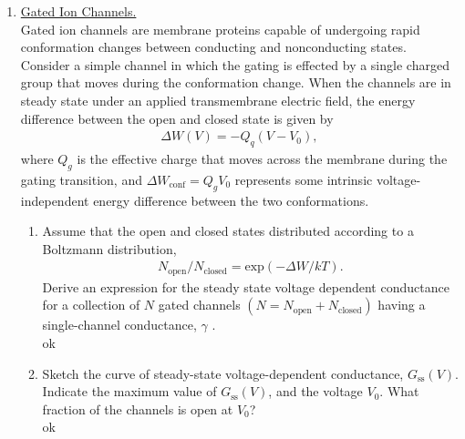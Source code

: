 \documentclass[11pt]{article}
\begin{document}
\begin{enumerate}[label=\arabic*.]
\newpage
\item
\underline{Gated Ion Channels.}
\vspace*{1\baselineskip}
\\
Gated ion channels are membrane proteins capable of undergoing rapid conformation changes between conducting and nonconducting states. Consider a simple channel in which the gating is effected by a single charged group that moves during the conformation change. When the channels are in steady state under an applied transmembrane electric field, the energy difference between the open and closed state is given by
\begin{align*}
\Delta W(V) = -Q_q(V - V_0),
\end{align*}
where $Q_g$ is the effective charge that moves across the membrane during the gating transition, and $\Delta W_{\text{conf}} = Q_g V_0$ represents some intrinsic voltage-independent energy difference between the two conformations.
\begin{enumerate}[label=(\alph*)]
\item
Assume that the open and closed states distributed according to a Boltzmann distribution,
\begin{align*}
N_{\text{open}} / N_{\text{closed}} = \text{exp}(-\Delta W / kT).
\end{align*}
Derive an expression for the steady state voltage dependent conductance for a collection of $N$ gated channels $\left(N = N_{\text{open}} + N_{\text{closed}}\right)$ having a single-channel conductance, $\gamma$ .
\vspace*{1\baselineskip}
\\
ok







\vspace*{1\baselineskip}
\item
Sketch the curve of steady-state voltage-dependent conductance, $G_{\text{ss}}(V)$. Indicate the maximum value of $G_{\text{ss}}(V)$, and the voltage $V_0$. What fraction of the channels is open at $V_0$?
\vspace*{1\baselineskip}
\\
ok










\end{enumerate}
\end{enumerate}
\end{document}
